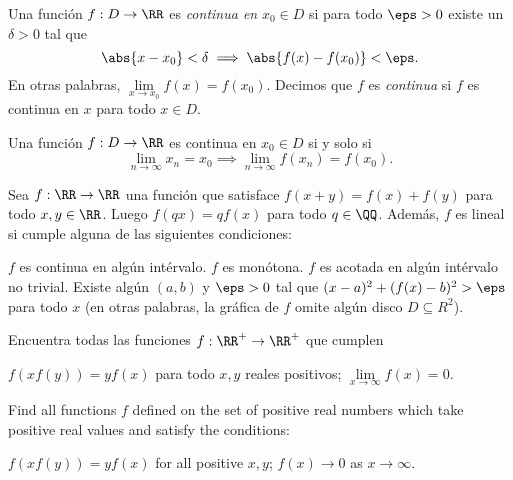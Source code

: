 
\begin{definition}[Continuidad]
  Una función $f:D\to\RR$ es \emph{continua en} $x_0\in D$ si para todo $\eps>0$
  existe un $\delta>0$ tal que
  \[\abs{x-x_0}<\delta\implies\abs{f(x)-f(x_0)}<\eps.\]
  En otras palabras, $\lim\limits_{x\to x_0}f(x)=f(x_0)$. Decimos que $f$ es
  \emph{continua} si $f$ es continua en $x$ para todo $x\in D$.
\end{definition}

\begin{proposition}
  Una función $f:D\to\RR$ es continua en $x_0\in D$ si y solo si
  \[\lim_{n\to\infty}x_n=x_0\implies\lim_{n\to\infty}f(x_n)=f(x_0).\]
\end{proposition}

\begin{theorem}
  Sea $f:\RR\to\RR$ una función que satisface $f(x+y)=f(x)+f(y)$ para todo
  $x,y\in\RR$. Luego $f(qx)=qf(x)$ para todo $q\in\QQ$. Además, $f$ es lineal si
  cumple alguna de las siguientes condiciones:
  \begin{itemize}
    \ii $f$ es continua en algún intérvalo.
    \ii $f$ es monótona.
    \ii $f$ es acotada en algún intérvalo no trivial.
    \ii Existe algún $(a,b)$ y $\eps>0$ tal que $(x-a)^2+(f(x)-b)^2>\eps$ para
    todo $x$ (en otras palabras, la gráfica de $f$ omite algún disco
    $D\subseteq R^2$).
  \end{itemize}
\end{theorem}

\begin{problem}[IMO 1983/1]
  Encuentra todas las funciones $f:\RR^+\to\RR^+$ que cumplen
  \begin{enumerate}[(i)]
    \ii $f(xf(y))=yf(x)$ para todo $x,y$ reales positivos;
    \ii $\lim\limits_{x\to\infty}f(x)=0$.
  \end{enumerate}
  \begin{hint}
    Find all functions $f$ defined on the set of positive real numbers which
    take positive real values and satisfy the conditions:
    \begin{enumerate}[(i)]
      \ii $f(xf(y))=yf(x)$ for all positive $x,y$;
      \ii $f(x)\to 0$ as $x\to\infty$.
    \end{enumerate}
  \end{hint}
\end{problem}

